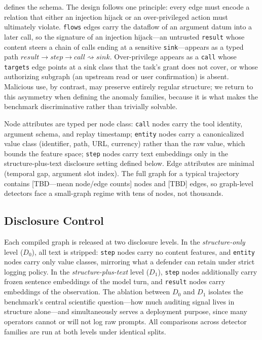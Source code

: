  defines the schema. The design follows one principle: every edge must encode a relation that either an injection hijack or an over-privileged action must ultimately violate. \texttt{flows} edges carry the dataflow of an argument datum into a later call, so the signature of an injection hijack---an untrusted \texttt{result} whose content steers a chain of calls ending at a sensitive \texttt{sink}---appears as a typed path $result \rightarrow step \rightarrow call \rightsquigarrow sink$. Over-privilege appears as a \texttt{call} whose \texttt{targets} edge points at a sink class that the task's grant does not cover, or whose authorizing subgraph (an upstream read or user confirmation) is absent. Malicious use, by contrast, may preserve entirely regular structure; we return to this asymmetry when defining the anomaly families, because it is what makes the benchmark discriminative rather than trivially solvable.

Node attributes are typed per node class: \texttt{call} nodes carry the tool identity, argument schema, and replay timestamp; \texttt{entity} nodes carry a canonicalized value class (identifier, path, URL, currency) rather than the raw value, which bounds the feature space; \texttt{step} nodes carry text embeddings only in the structure-plus-text disclosure setting defined below. Edge attributes are minimal (temporal gap, argument slot index). The full graph for a typical trajectory contains [TBD---mean node/edge counts] nodes and [TBD] edges, so graph-level detectors face a small-graph regime with tens of nodes, not thousands.

\subsection{Disclosure Control}
\label{sec:method-disclosure}

Each compiled graph is released at two disclosure levels. In the \emph{structure-only} level ($D_0$), all text is stripped: \texttt{step} nodes carry no content features, and \texttt{entity} nodes carry only value classes, mirroring what a defender can retain under strict logging policy. In the \emph{structure-plus-text} level ($D_1$), \texttt{step} nodes additionally carry frozen sentence embeddings of the model turn, and \texttt{result} nodes carry embeddings of the observation. The ablation between $D_0$ and $D_1$ isolates the benchmark's central scientific question---how much auditing signal lives in structure alone---and simultaneously serves a deployment purpose, since many operators cannot or will not log raw prompts. All comparisons across detector families are run at both levels under identical splits.

